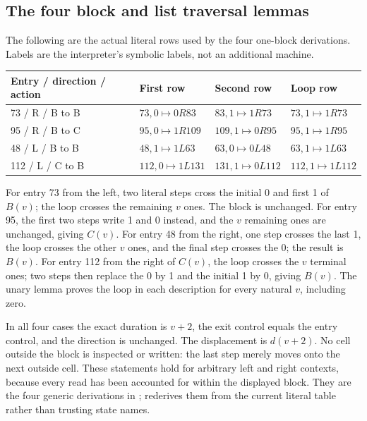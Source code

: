 \subsection{The four block and list traversal lemmas}

The following are the actual literal rows used by the four one-block
derivations.  Labels are the interpreter's symbolic labels, not an
additional machine.

\begin{center}
\begin{tabular}{llll}
\toprule
Entry / direction / action & First row & Second row & Loop row\\
\midrule
73 / R / B to B & $73,0\mapsto0R83$ & $83,1\mapsto1R73$
 & $73,1\mapsto1R73$\\
95 / R / B to C & $95,0\mapsto1R109$ & $109,1\mapsto0R95$
 & $95,1\mapsto1R95$\\
48 / L / B to B & $48,1\mapsto1L63$ & $63,0\mapsto0L48$
 & $63,1\mapsto1L63$\\
112 / L / C to B & $112,0\mapsto1L131$ & $131,1\mapsto0L112$
 & $112,1\mapsto1L112$\\
\bottomrule
\end{tabular}
\end{center}

For entry 73 from the left, two literal steps cross the initial 0 and
first 1 of $B(v)$; the loop crosses the remaining $v$ ones.  The block is
unchanged.  For entry 95, the first two steps write 1 and 0 instead, and
the $v$ remaining ones are unchanged, giving $C(v)$.  For entry 48 from
the right, one step crosses the last 1, the loop crosses the other $v$
ones, and the final step crosses the 0; the result is $B(v)$.  For entry
112 from the right of $C(v)$, the loop crosses the $v$ terminal ones;
two steps then replace the 0 by 1 and the initial 1 by 0, giving $B(v)$.
The unary lemma proves the loop in each description for every natural
$v$, including zero.

In all four cases the exact duration is $v+2$, the exit control equals
the entry control, and the direction is unchanged.  The displacement is
$d(v+2)$.  No cell outside the block is inspected or written: the last
step merely moves onto the next outside cell.  These statements hold for
arbitrary left and right contexts, because every read has been accounted
for within the displayed block.  They are the four generic derivations
in ;  rederives them
from the current literal table rather than trusting state names.

